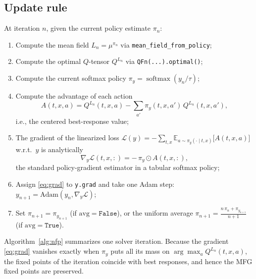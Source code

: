 \documentclass[11pt,a4paper]{article}
\begin{document}
\subsection{Update rule}
At iteration $n$, given the current policy estimate $\pi_n$:
\begin{enumerate}
  \item Compute the mean field $L_n = \mu^{\pi_n}$ via
        \texttt{mean\_field\_from\_policy};
  \item Compute the optimal $Q$-tensor $Q^{L_n}$ via \texttt{QFn(...).optimal()};
  \item Compute the current softmax policy $\pi_y = \operatorname{softmax}(y_n/\tau)$;
  \item Compute the advantage of each action
        \begin{equation}
          A(t, x, a) = Q^{L_n}(t, x, a)
                       - \sum_{a'} \pi_y(t, x, a')\, Q^{L_n}(t, x, a'),
        \end{equation}
        i.e., the centered best-response value;
  \item The gradient of the linearized loss
        $\mathcal{L}(y) = -\sum_{t,x} \mathbb{E}_{a \sim \pi_y(\cdot \mid t, x)}
          \bigl[ A(t, x, a) \bigr]$ w.r.t.\ $y$ is analytically
        \begin{equation}
          \nabla_y \mathcal{L}(t, x, :) = -\,\pi_y \odot A(t, x, :),
          \label{eq:grad}
        \end{equation}
        the standard policy-gradient estimator in a tabular softmax policy;
  \item Assign \eqref{eq:grad} to \texttt{y.grad} and take one Adam step:
        $y_{n+1} = \mathrm{Adam}(y_n, \nabla_y \mathcal{L})$;
  \item Set $\pi_{n+1} = \pi_{y_{n+1}}$ (if $\mathrm{avg} = \texttt{False}$), or
        the uniform average $\pi_{n+1} = \frac{n\,\pi_n + \pi_{y_{n+1}}}{n+1}$
        (if $\mathrm{avg} = \texttt{True}$).
\end{enumerate}

Algorithm~\ref{alg:nfp} summarizes one solver iteration. Because the gradient
\eqref{eq:grad} vanishes exactly when $\pi_y$ puts all its mass on
$\arg\max_a Q^{L_n}(t, x, a)$, the fixed points of the iteration coincide with
best responses, and hence the MFG fixed points are preserved.
\end{document}
